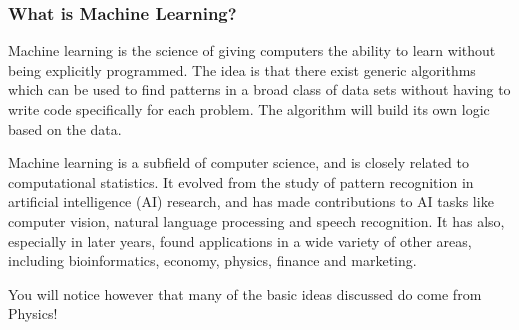 \documentclass{beamer}
\begin{document}
\begin{frame}
\frametitle{What is Machine Learning?}

\begin{block}{}
Machine learning is the science of giving computers the ability to
learn without being explicitly programmed.  The idea is that there
exist generic algorithms which can be used to find patterns in a broad
class of data sets without having to write code specifically for each
problem. The algorithm will build its own logic based on the data.

Machine learning is a subfield of computer science, and is closely
related to computational statistics.  It evolved from the study of
pattern recognition in artificial intelligence (AI) research, and has
made contributions to AI tasks like computer vision, natural language
processing and speech recognition. It has also, especially in later
years, found applications in a wide variety of other areas, including
bioinformatics, economy, physics, finance and marketing.

You will notice however that many of the basic ideas discussed do come from Physics!
\end{block}
\end{frame}
\end{document}

